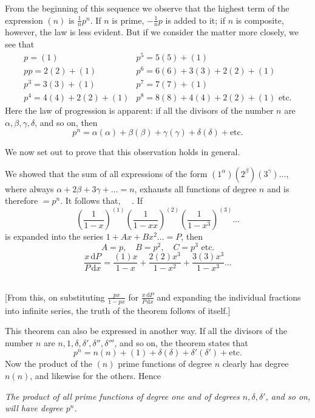 From the beginning of this sequence we observe that the highest term of the expression $(n)$ is $\frac1n p^n$. If $n$ is prime, $-\frac1n p$ is added to it; if $n$ is composite, however, the law is less evident. But if we consider the matter more closely, we see that
\[
\begin{array}{ll}
p=(1)&p^5=5(5)+(1)\\
pp=2(2)+(1)&p^6=6(6)+3(3)+2(2)+(1)\\
p^3=3(3)+(1)&p^7=7(7)+(1)\\
p^4=4(4)+2(2)+(1)&p^8=8(8)+4(4)+2(2)+(1)\text{ etc.}
\end{array}
\]
Here the law of progression is apparent: if all the divisors of the number $n$ are $\alpha,\beta,\gamma,\delta$, and so on, then
\[
p^n=\alpha(\alpha)+\beta(\beta)+\gamma(\gamma)+\delta(\delta)+\text{etc.}
\]

We now set out to prove that this observation holds in general.

We showed that the sum of all expressions of the form $(1^\alpha)(2^\beta)(3^\gamma)\ldots$, where always $\alpha+2\beta+3\gamma+\ldots=n$, exhausts all functions of degree $n$ and is therefore $=p^n$. It follows that, \textemdash\ \textemdash\ \textemdash. If
\[
\left(\frac1{1-x}\right)^{(1)}\left(\frac1{1-xx}\right)^{(2)}\left(\frac1{1-x^3}\right)^{(3)}\ldots
\]
is expanded into the series $1+Ax+Bx^2\ldots=P$, then
\[
A=p,\quad B=p^2,\quad C=p^3\text{ etc.}
\]
\[
\frac{x\,\mathrm{d}P}{P\,\mathrm{d}x}=\frac{(1)x}{1-x}+\frac{2(2)x^3}{1-x^2}+\frac{3(3)x^3}{1-x^3}\ldots
\]
\noindent\hspace*{.28\linewidth}\textemdash\ \textemdash\ \textemdash\ \textemdash

[From this, on substituting $\frac{px}{1-px}$ for $\frac{x\,\mathrm{d}P}{P\,\mathrm{d}x}$ and expanding the individual fractions into infinite series, the truth of the theorem follows of itself.]

This theorem can also be expressed in another way. If all the divisors of the number $n$ are $n,1,\delta,\delta',\delta'',\delta'''$, and so on, the theorem states that
\[
p^n=n(n)+(1)+\delta(\delta)+\delta'(\delta')+\text{etc.}
\]
Now the product of the $(n)$ prime functions of degree $n$ clearly has degree $n(n)$, and likewise for the others. Hence

\emph{The product of all prime functions of degree one and of degrees $n,\delta,\delta'$, and so on, will have degree $p^n$.}

